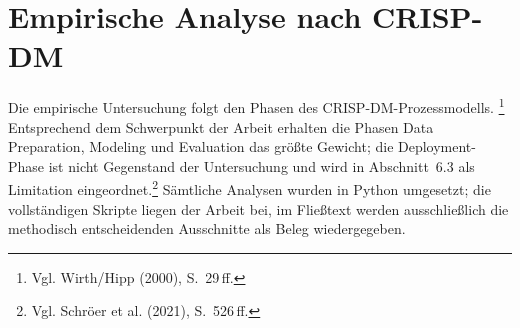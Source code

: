 %
%

\section{Empirische Analyse nach CRISP-DM}
\label{sec:empirie}

Die empirische Untersuchung folgt den Phasen des CRISP-DM-Prozessmodells.%
\footnote{Vgl. Wirth/Hipp (2000), S.~29\,ff.}
Entsprechend dem Schwerpunkt der Arbeit erhalten die Phasen Data Preparation,
Modeling und Evaluation das größte Gewicht; die Deployment-Phase ist nicht
Gegenstand der Untersuchung und wird in Abschnitt~6.3 als Limitation
eingeordnet.\footnote{Vgl. Schröer et al. (2021), S.~526\,ff.} Sämtliche
Analysen wurden in Python umgesetzt; die vollständigen Skripte liegen der
Arbeit bei, im Fließtext werden ausschließlich die methodisch entscheidenden
Ausschnitte als Beleg wiedergegeben.

